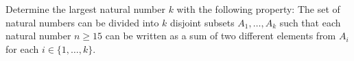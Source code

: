 Determine the largest natural number $k$ with the following property:
The set of natural numbers can be divided into $k$ disjoint subsets $A_1,\dots,A_k$ such that
each natural number $n\ge 15$ can be written as a sum of two different elements
from $A_i$ for each $i \in \{1,\dots,k\}$.